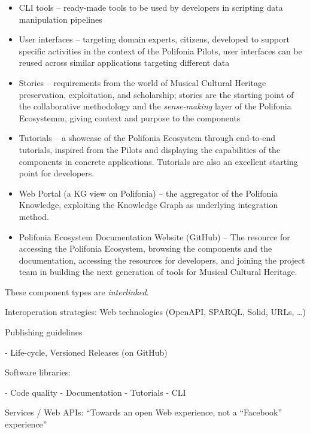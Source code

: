 \begin{itemize}
\item CLI tools -- ready-made tools to be used by developers in scripting data manipulation pipelines
\item User interfaces -- targeting domain experts, citizens, developed to support specific activities in the context of the Polifonia Pilots, user interfaces can be reused across similar applications targeting different data
\item Stories -- requirements from the world of Musical Cultural Heritage preservation, exploitation, and scholarship; stories are the starting point of the collaborative methodology and the \textit{sense-making} layer of the Polifonia Ecosystemm, giving context and purpose to the components
\item Tutorials -- a showcase of the Polifonia Ecosystem through end-to-end tutorials, inspired from the Pilots and displaying the capabilities of the components in concrete applications. Tutorials are also an excellent starting point for developers.
\item Web Portal (a KG view on Polifonia) -- the aggregator of the Polifonia Knowledge, exploiting the Knowledge Graph as underlying integration method.
\item Polifonia Ecosystem Documentation Website (GitHub) -- The resource for accessing the Polifonia Ecosystem, browsing the components and the documentation, accessing the resources for developers, and joining the project team in building the next generation of tools for Musical Cultural Heritage.
\end{itemize}

These component types are \textit{interlinked}. 

Interoperation strategies: Web technologies (OpenAPI, SPARQL, Solid, URLs, …) 





Publishing guidelines

- Life-cycle, Versioned Releases (on GitHub) 

Software libraries:

- Code quality 
- Documentation  
- Tutorials 
- CLI 

Services / Web APIs: “Towards an open Web experience, not a “Facebook” experience” 

